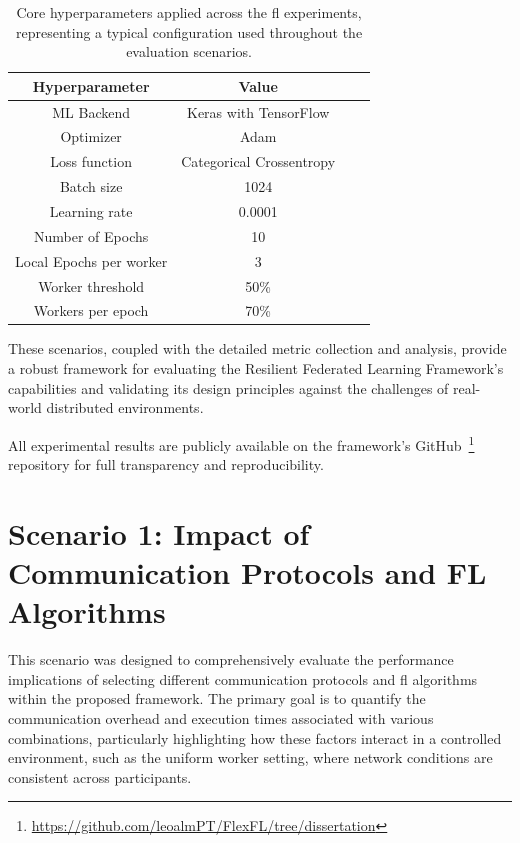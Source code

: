 \begin{table}[!htb]
    \centering
    \caption[Core Hyperparameters for Experiments]{Core hyperparameters applied across the \ac{fl} experiments, representing a typical configuration used throughout the evaluation scenarios.}    \label{tab:hyperparameters}
    \begin{tabular}{Sc Sc}
        \toprule
        \textbf{Hyperparameter} & \textbf{Value} \\
        \midrule
        ML Backend & Keras with TensorFlow \\
        Optimizer & Adam \\
        Loss function & Categorical Crossentropy \\
        Batch size & 1024 \\
        Learning rate & 0.0001 \\
        Number of Epochs & 10 \\
        Local Epochs per worker & 3 \\
        Worker threshold & 50\% \\
        Workers per epoch & 70\% \\
        \bottomrule
    \end{tabular}
\end{table}

These scenarios, coupled with the detailed metric collection and analysis, provide a robust framework for evaluating the Resilient Federated Learning Framework's capabilities and validating its design principles against the challenges of real-world distributed environments.

All experimental results are publicly available on the framework's GitHub~\footnote{\url{https://github.com/leoalmPT/FlexFL/tree/dissertation}} repository for full transparency and reproducibility.



\section{Scenario 1: Impact of Communication Protocols and FL Algorithms}
\label{sec:scenario-1}

This scenario was designed to comprehensively evaluate the performance implications of selecting different communication protocols and \ac{fl} algorithms within the proposed framework. The primary goal is to quantify the communication overhead and execution times associated with various combinations, particularly highlighting how these factors interact in a controlled environment, such as the uniform worker setting, where network conditions are consistent across participants. 

